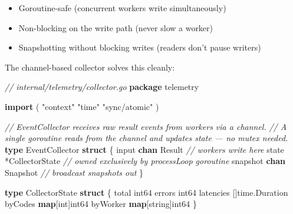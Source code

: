 \documentclass[
]{article}
\newenvironment{Shaded}{}{}
\newcommand{\CommentTok}[1]{\textcolor[rgb]{0.38,0.63,0.69}{\textit{#1}}}
\newcommand{\DataTypeTok}[1]{\textcolor[rgb]{0.56,0.13,0.00}{#1}}
\newcommand{\KeywordTok}[1]{\textcolor[rgb]{0.00,0.44,0.13}{\textbf{#1}}}
\newcommand{\NormalTok}[1]{#1}
\newcommand{\OperatorTok}[1]{\textcolor[rgb]{0.40,0.40,0.40}{#1}}
\newcommand{\StringTok}[1]{\textcolor[rgb]{0.25,0.44,0.63}{#1}}
\providecommand{\tightlist}{%
  \setlength{\itemsep}{0pt}\setlength{\parskip}{0pt}}
\begin{document}
\begin{itemize}
\tightlist
\item
  Goroutine-safe (concurrent workers write simultaneously)
\item
  Non-blocking on the write path (never slow a worker)
\item
  Snapshotting without blocking writes (readers don't pause writers)
\end{itemize}

The channel-based collector solves this cleanly:

\begin{Shaded}
\begin{Highlighting}[]
\CommentTok{// internal/telemetry/collector.go}
\KeywordTok{package}\NormalTok{ telemetry}

\KeywordTok{import} \OperatorTok{(}
    \StringTok{"context"}
    \StringTok{"time"}
    \StringTok{"sync/atomic"}
\OperatorTok{)}

\CommentTok{// EventCollector receives raw result events from workers via a channel.}
\CommentTok{// A single goroutine reads from the channel and updates state — no mutex needed.}
\KeywordTok{type}\NormalTok{ EventCollector }\KeywordTok{struct} \OperatorTok{\{}
\NormalTok{    input    }\KeywordTok{chan}\NormalTok{ Result        }\CommentTok{// workers write here}
\NormalTok{    state    }\OperatorTok{*}\NormalTok{CollectorState   }\CommentTok{// owned exclusively by processLoop goroutine}
\NormalTok{    snapshot }\KeywordTok{chan}\NormalTok{ Snapshot      }\CommentTok{// broadcast snapshots out}
\OperatorTok{\}}

\KeywordTok{type}\NormalTok{ CollectorState }\KeywordTok{struct} \OperatorTok{\{}
\NormalTok{    total     }\DataTypeTok{int64}
\NormalTok{    errors    }\DataTypeTok{int64}
\NormalTok{    latencies }\OperatorTok{[]}\NormalTok{time}\OperatorTok{.}\NormalTok{Duration}
\NormalTok{    byCodes   }\KeywordTok{map}\OperatorTok{[}\DataTypeTok{int}\OperatorTok{]}\DataTypeTok{int64}
\NormalTok{    byWorker  }\KeywordTok{map}\OperatorTok{[}\DataTypeTok{string}\OperatorTok{]}\DataTypeTok{int64}
\OperatorTok{\}}


\end{Highlighting}
\end{Shaded}
\end{document}
